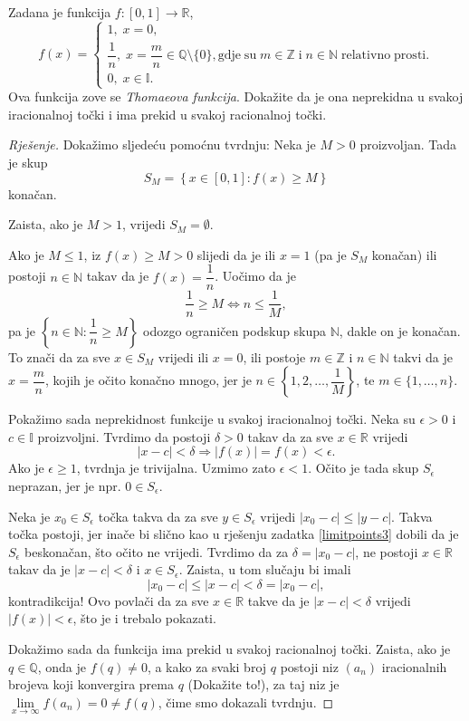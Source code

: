 \begin{exercise}
Zadana je funkcija $f : [0, 1]\to \mathbb{R}$, $$f(x)=\begin{cases}
1, \; x=0,\\
\dfrac{1}{n},\; x=\dfrac{m}{n}\in \mathbb{Q}\setminus\{0\},\mathrm{gdje\;su\;}m\in \mathbb{Z}\mathrm{\;i\;}n\in \mathbb{N}\mathrm{\;relativno\;prosti.}\\
0,\; x\in \mathbb{I}.
\end{cases}$$
Ova funkcija zove se \textit{Thomaeova funkcija}. Dokažite da je ona neprekidna u svakoj iracionalnoj točki i ima prekid u svakoj racionalnoj točki.
\end{exercise}
\begin{proof}[Rješenje]
Dokažimo sljedeću pomoćnu tvrdnju: Neka je $M>0$ proizvoljan. Tada je skup
$$S_M=\left\{x\in[0, 1] : f(x)\geq M\right\}$$
konačan. 

Zaista, ako je $M>1$, vrijedi $S_M=\emptyset$. 

Ako je $M\leq 1$, iz $f(x)\geq M>0$ slijedi da je ili $x=1$ (pa je $S_M$ konačan) ili postoji $n\in \mathbb{N}$ takav da je $f(x)=\dfrac{1}{n}$. Uočimo da je $$\dfrac{1}{n}\geq M\Longleftrightarrow n\leq \dfrac{1}{M},$$ pa je $\left\{n\in \mathbb{N} : \dfrac{1}{n}\geq M\right\}$ odozgo ograničen podskup skupa $\mathbb{N}$, dakle on je konačan. To znači da za sve $x\in S_M$ vrijedi ili $x=0$, ili postoje $m\in \mathbb{Z}$ i $n\in \mathbb{N}$ takvi da je $x=\dfrac{m}{n}$, kojih je očito konačno mnogo, jer je $n\in \left\{1, 2,\dots, \dfrac{1}{M}\right\}$, te $m\in \{1, \dots, n\}$.

Pokažimo sada neprekidnost funkcije u svakoj iracionalnoj točki. Neka su $\epsilon>0$ i $c\in \mathbb{I}$ proizvoljni. Tvrdimo da postoji $\delta>0$ takav da za sve $x\in \mathbb{R}$ vrijedi $$|x-c|<\delta\Rightarrow |f(x)|=f(x)<\epsilon.$$ 
Ako je $\epsilon\geq 1$, tvrdnja je trivijalna. Uzmimo zato $\epsilon<1$. Očito je tada skup $S_\epsilon$ neprazan, jer je npr. $0\in S_\epsilon$.

Neka je $x_0\in S_\epsilon$ točka takva da za sve $y\in S_\epsilon$ vrijedi $|x_0-c|\leq|y-c|$. Takva točka postoji, jer inače bi slično kao u rješenju zadatka \ref{limitpoints3} dobili da je $S_\epsilon$ beskonačan, što očito ne vrijedi. Tvrdimo da za $\delta=|x_0-c|$, ne postoji $x\in \mathbb{R}$ takav da je $|x-c|<\delta$ i $x\in S_\epsilon$. Zaista, u tom slučaju bi imali $$|x_0-c|\leq |x-c|<\delta=|x_0-c|,$$ kontradikcija! Ovo povlači da za sve $x\in \mathbb{R}$ takve da je $|x-c|<\delta$ vrijedi $|f(x)|<\epsilon$, što je i trebalo pokazati.

Dokažimo sada da funkcija ima prekid u svakoj racionalnoj točki. Zaista, ako je $q\in \mathbb{Q}$, onda je $f(q)\neq 0$, a kako za svaki broj $q$ postoji niz $(a_n)$ iracionalnih brojeva koji konvergira prema $q$ (Dokažite to!), za taj niz je $\lim\limits_{x\to \infty}{f(a_n)}=0\neq f(q)$, čime smo dokazali tvrdnju.
\end{proof}
